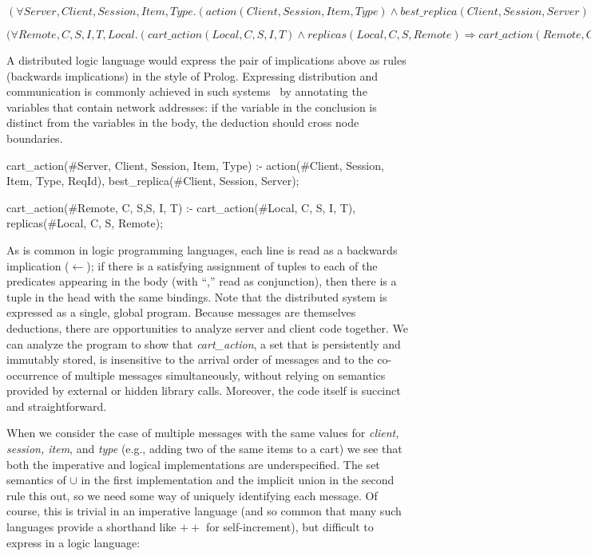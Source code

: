 $(\forall Server, Client, Session, Item, Type . ( action(Client, Session, Item, Type) 
\land best\_replica(Client, Session, Server) ) \Rightarrow cart\_action(Server, Client, Session, Item, Type)) $


$(\forall Remote, C, S, I, T, Local . (cart\_action(Local, C, S, I, T) \land
replicas(Local, C, S, Remote) \Rightarrow cart\_action(Remote, C, S, I, T))
$

A distributed logic language would express the pair of implications above as rules
(backwards implications) in the style of Prolog.  Expressing distribution and communication
is commonly achieved in such systems~\cite{Loo} by annotating the variables that 
contain network addresses: if the variable in the conclusion is distinct from the variables in
the body, the deduction should cross node boundaries.

\begin{Dedalus}
cart\_action(#Server, Client, Session, Item, Type) :-
  action(#Client, Session, Item, Type, ReqId),
  best_replica(#Client, Session, Server);

cart\_action(#Remote, C, S,S, I, T) :-
  cart\_action(#Local, C, S, I, T),
  replicas(#Local, C, S, Remote);
\end{Dedalus}

As is common in logic programming languages, each line is read as a backwards
implication ($\leftarrow$); if there is a satisfying assignment of tuples to each of
the predicates appearing in the body (with ``,'' read as conjunction), 
then there is a tuple in the head with the same bindings.
Note that the distributed system is expressed as a single, global program.
Because messages are themselves deductions, there are opportunities to 
analyze server and client code together.  We can analyze the program to 
show that {\em cart\_action}, a set that is persistently and immutably
stored, is insensitive to the arrival order of messages 
and to the co-occurrence of multiple messages simultaneously, without relying
on semantics provided by external or hidden library calls. Moreover, the code 
itself is succinct and straightforward. 




When we consider the case of multiple messages with the same values for
{\em client, session, item}, and {\em type} (e.g., adding two of the same items to a cart)
we see that both the imperative and logical implementations are underspecified.
The set semantics of $\cup$ in the first implementation and the implicit union 
in the second rule this out, so we need some way of uniquely identifying each message.
Of course, this is trivial in an imperative language (and so common that many such languages
provide a shorthand like $++$ for self-increment), but difficult to express in a logic language:

